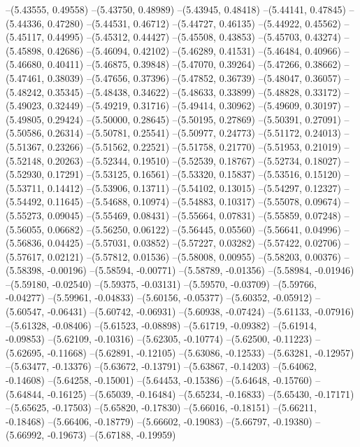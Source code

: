 --(5.43555, 0.49558)
--(5.43750, 0.48989)
--(5.43945, 0.48418)
--(5.44141, 0.47845)
--(5.44336, 0.47280)
--(5.44531, 0.46712)
--(5.44727, 0.46135)
--(5.44922, 0.45562)
--(5.45117, 0.44995)
--(5.45312, 0.44427)
--(5.45508, 0.43853)
--(5.45703, 0.43274)
--(5.45898, 0.42686)
--(5.46094, 0.42102)
--(5.46289, 0.41531)
--(5.46484, 0.40966)
--(5.46680, 0.40411)
--(5.46875, 0.39848)
--(5.47070, 0.39264)
--(5.47266, 0.38662)
--(5.47461, 0.38039)
--(5.47656, 0.37396)
--(5.47852, 0.36739)
--(5.48047, 0.36057)
--(5.48242, 0.35345)
--(5.48438, 0.34622)
--(5.48633, 0.33899)
--(5.48828, 0.33172)
--(5.49023, 0.32449)
--(5.49219, 0.31716)
--(5.49414, 0.30962)
--(5.49609, 0.30197)
--(5.49805, 0.29424)
--(5.50000, 0.28645)
--(5.50195, 0.27869)
--(5.50391, 0.27091)
--(5.50586, 0.26314)
--(5.50781, 0.25541)
--(5.50977, 0.24773)
--(5.51172, 0.24013)
--(5.51367, 0.23266)
--(5.51562, 0.22521)
--(5.51758, 0.21770)
--(5.51953, 0.21019)
--(5.52148, 0.20263)
--(5.52344, 0.19510)
--(5.52539, 0.18767)
--(5.52734, 0.18027)
--(5.52930, 0.17291)
--(5.53125, 0.16561)
--(5.53320, 0.15837)
--(5.53516, 0.15120)
--(5.53711, 0.14412)
--(5.53906, 0.13711)
--(5.54102, 0.13015)
--(5.54297, 0.12327)
--(5.54492, 0.11645)
--(5.54688, 0.10974)
--(5.54883, 0.10317)
--(5.55078, 0.09674)
--(5.55273, 0.09045)
--(5.55469, 0.08431)
--(5.55664, 0.07831)
--(5.55859, 0.07248)
--(5.56055, 0.06682)
--(5.56250, 0.06122)
--(5.56445, 0.05560)
--(5.56641, 0.04996)
--(5.56836, 0.04425)
--(5.57031, 0.03852)
--(5.57227, 0.03282)
--(5.57422, 0.02706)
--(5.57617, 0.02121)
--(5.57812, 0.01536)
--(5.58008, 0.00955)
--(5.58203, 0.00376)
--(5.58398, -0.00196)
--(5.58594, -0.00771)
--(5.58789, -0.01356)
--(5.58984, -0.01946)
--(5.59180, -0.02540)
--(5.59375, -0.03131)
--(5.59570, -0.03709)
--(5.59766, -0.04277)
--(5.59961, -0.04833)
--(5.60156, -0.05377)
--(5.60352, -0.05912)
--(5.60547, -0.06431)
--(5.60742, -0.06931)
--(5.60938, -0.07424)
--(5.61133, -0.07916)
--(5.61328, -0.08406)
--(5.61523, -0.08898)
--(5.61719, -0.09382)
--(5.61914, -0.09853)
--(5.62109, -0.10316)
--(5.62305, -0.10774)
--(5.62500, -0.11223)
--(5.62695, -0.11668)
--(5.62891, -0.12105)
--(5.63086, -0.12533)
--(5.63281, -0.12957)
--(5.63477, -0.13376)
--(5.63672, -0.13791)
--(5.63867, -0.14203)
--(5.64062, -0.14608)
--(5.64258, -0.15001)
--(5.64453, -0.15386)
--(5.64648, -0.15760)
--(5.64844, -0.16125)
--(5.65039, -0.16484)
--(5.65234, -0.16833)
--(5.65430, -0.17171)
--(5.65625, -0.17503)
--(5.65820, -0.17830)
--(5.66016, -0.18151)
--(5.66211, -0.18468)
--(5.66406, -0.18779)
--(5.66602, -0.19083)
--(5.66797, -0.19380)
--(5.66992, -0.19673)
--(5.67188, -0.19959)
